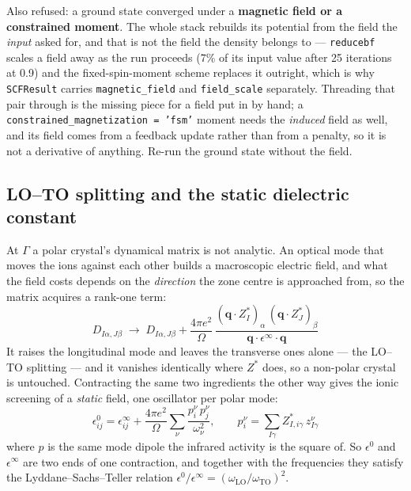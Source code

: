 \documentclass[11pt,a4paper]{article}
\newcommand{\code}[1]{\texttt{\small #1}}
\begin{document}
\begin{refuses}
Also refused: a ground state converged under a \textbf{magnetic field or a
constrained moment}. The whole stack rebuilds its potential from the field the
\emph{input} asked for, and that is not the field the density belongs to ---
\code{reducebf} scales a field away as the run proceeds (7\% of its input
value after 25 iterations at 0.9) and the fixed-spin-moment scheme replaces it
outright, which is why \code{SCFResult} carries \code{magnetic\_field} and
\code{field\_scale} separately. Threading that pair through is the missing
piece for a field put in by hand; a \code{constrained\_magnetization = 'fsm'}
moment needs the \emph{induced} field as well, and its field comes from a
feedback update rather than from a penalty, so it is not a derivative of
anything. Re-run the ground state without the field.
\end{refuses}

\subsection*{LO--TO splitting and the static dielectric constant}

At $\Gamma$ a polar crystal's dynamical matrix is not analytic. An optical mode
that moves the ions against each other builds a macroscopic electric field, and
what the field costs depends on the \emph{direction} the zone centre is
approached from, so the matrix acquires a rank-one term:
\begin{equation*}
D_{I\alpha,J\beta} \;\to\; D_{I\alpha,J\beta}
  + \frac{4\pi e^2}{\Omega}\,
    \frac{(\mathbf q\!\cdot\!Z^{\ast}_I)_\alpha\,
           (\mathbf q\!\cdot\!Z^{\ast}_J)_\beta}
          {\mathbf q\cdot\epsilon^\infty\cdot\mathbf q}
\end{equation*}
It raises the longitudinal mode and leaves the transverse ones alone --- the
LO--TO splitting --- and it vanishes identically where $Z^{\ast}$ does, so a
non-polar crystal is untouched. Contracting the same two ingredients the other
way gives the ionic screening of a \emph{static} field, one oscillator per polar
mode:
\begin{equation*}
\epsilon^0_{ij} = \epsilon^\infty_{ij}
  + \frac{4\pi e^2}{\Omega}\sum_\nu
    \frac{p^\nu_i\,p^\nu_j}{\omega_\nu^2},
\qquad
p^\nu_i = \sum_{I\gamma} Z^{\ast}_{I,i\gamma}\,z^\nu_{I\gamma}
\end{equation*}
where $p$ is the same mode dipole the infrared activity is the square of. So
$\epsilon^0$ and $\epsilon^\infty$ are two ends of one contraction, and
together with the frequencies they satisfy the Lyddane--Sachs--Teller relation
$\epsilon^0/\epsilon^\infty = (\omega_{\mathrm{LO}}/\omega_{\mathrm{TO}})^2$.
\end{document}
